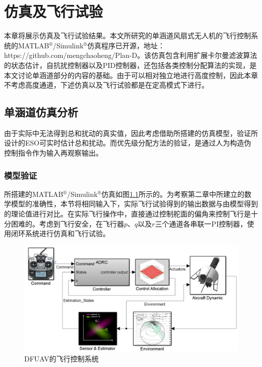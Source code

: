 \chapter{仿真及飞行试验}
%
本章将展示仿真及飞行试验结果。本文所研究的单涵道风扇式无人机的飞行控制系统的MATLAB$^\circledR$/Simulink$^\circledR$仿真程序已开源，地址：https://github.com/mengchaoheng/Plan-D。该仿真包含利用扩展卡尔曼滤波算法的状态估计，自抗扰控制器以及PID控制器，还包括各类控制分配算法的实现，是本文讨论单涵道部分的内容的基础。由于可以相对独立地进行高度控制，因此本章不考虑高度通道，下述仿真以及飞行试验都是在定高模式下进行。
\section{单涵道仿真分析}
由于实际中无法得到总和扰动的真实值，因此考虑借助所搭建的仿真模型，验证所设计的ESO可实时估计总和扰动。而优先级分配方法的验证，是通过人为构造伪控制指令作为输入再观察输出。
\subsection{模型验证}
所搭建的MATLAB$^\circledR$/Simulink$^\circledR$仿真如图\ref{system}所示的。为考察第二章中所建立的数学模型的准确性，本节将相同输入下，实际飞行试验得到的输出数据与由模型得到的理论值进行对比。在实际飞行操作中，直接通过控制舵面的偏角来控制飞行是十分困难的。考虑到飞行安全，在飞行器$ p$、$q$以及$r$三个通道各串联一PI控制器，使用闭环系统进行仿真和飞行试验。
\begin{figure}[htbp]
	\centering	
	\includegraphics[scale=0.38]{Fig/system.png}
	\caption{\label{system}DFUAV的飞行控制系统}
\end{figure}


